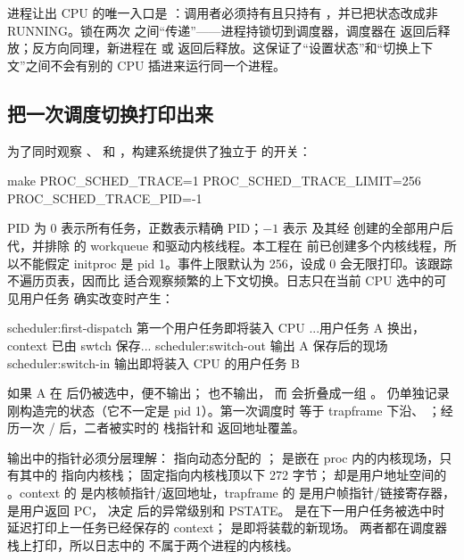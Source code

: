 进程让出 CPU 的唯一入口是 ：调用者必须持有且只持有 ，并已把状态改成非 RUNNING。锁在两次  之间“传递”——进程持锁切到调度器，调度器在  返回后释放；反方向同理，新进程在  或  返回后释放。这保证了“设置状态”和“切换上下文”之间不会有别的 CPU 插进来运行同一个进程。

\subsection{把一次调度切换打印出来}

为了同时观察 、 和 ，构建系统提供了独立于
 的开关：

\begin{shcode}
make PROC_SCHED_TRACE=1 PROC_SCHED_TRACE_LIMIT=256 PROC_SCHED_TRACE_PID=-1
\end{shcode}

PID 为 0 表示所有任务，正数表示精确 PID；$-1$ 表示  及其经
 创建的全部用户后代，并排除  的 workqueue
和驱动内核线程。本工程在  前已创建多个内核线程，所以不能假定
initproc 是 pid 1。事件上限默认为 256，设成 0 会无限打印。该跟踪不遍历页表，因而比
 适合观察频繁的上下文切换。日志只在当前 CPU 选中的可见用户任务
确实改变时产生：

\begin{txtcode}
scheduler:first-dispatch 第一个用户任务即将装入 CPU
  ...用户任务 A 换出，context 已由 swtch 保存...
scheduler:switch-out     输出 A 保存后的现场
scheduler:switch-in      输出即将装入 CPU 的用户任务 B
\end{txtcode}

如果 A 在  后仍被选中，便不输出； 也不输出，
而  会折叠成一组 。
仍单独记录  刚构造完的状态（它不一定是 pid 1）。第一次调度时
 等于 trapframe 下沿、
；经历一次 / 后，二者被实时的 
栈指针和  返回地址覆盖。

输出中的指针必须分层理解： 指向动态分配的 ；
 是嵌在 proc 内的内核现场，只有其中的  指向内核栈；
 固定指向内核栈顶以下 272 字节； 却是用户地址空间的
。context 的  是内核帧指针/返回地址，trapframe 的
 是用户帧指针/链接寄存器， 是用户返回 PC， 决定
 后的异常级别和 PSTATE。 是在下一用户任务被选中时
延迟打印上一任务已经保存的 context； 是即将装载的新现场。
两者都在调度器栈上打印，所以日志中的  不属于两个进程的内核栈。

